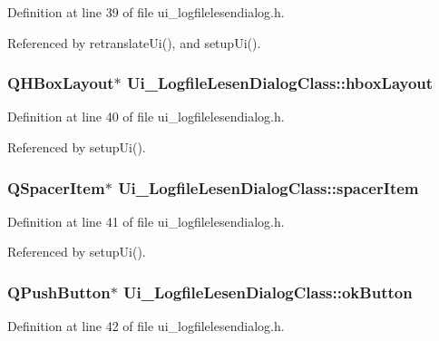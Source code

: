 Definition at line 39 of file ui\_\-logfilelesendialog.h.

Referenced by retranslateUi(), and setupUi().\hypertarget{class_ui___logfile_lesen_dialog_class_845b8b80a40fa27a6ea93a4b30252f37}{
\subsubsection[hboxLayout]{\setlength{\rightskip}{0pt plus 5cm}QHBoxLayout$\ast$ {\bf Ui\_\-LogfileLesenDialogClass::hboxLayout}}}
\label{class_ui___logfile_lesen_dialog_class_845b8b80a40fa27a6ea93a4b30252f37}




Definition at line 40 of file ui\_\-logfilelesendialog.h.

Referenced by setupUi().\hypertarget{class_ui___logfile_lesen_dialog_class_29736c08cc200a0aad75cab45b7828cd}{
\subsubsection[spacerItem]{\setlength{\rightskip}{0pt plus 5cm}QSpacerItem$\ast$ {\bf Ui\_\-LogfileLesenDialogClass::spacerItem}}}
\label{class_ui___logfile_lesen_dialog_class_29736c08cc200a0aad75cab45b7828cd}




Definition at line 41 of file ui\_\-logfilelesendialog.h.

Referenced by setupUi().\hypertarget{class_ui___logfile_lesen_dialog_class_3ddb758f07a4c58549b78331cc8b52ad}{
\subsubsection[okButton]{\setlength{\rightskip}{0pt plus 5cm}QPushButton$\ast$ {\bf Ui\_\-LogfileLesenDialogClass::okButton}}}
\label{class_ui___logfile_lesen_dialog_class_3ddb758f07a4c58549b78331cc8b52ad}




Definition at line 42 of file ui\_\-logfilelesendialog.h.

